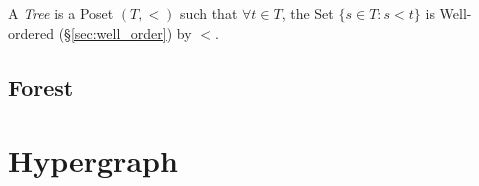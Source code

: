 A \emph{Tree} is a Poset $(T,<)$ such that $\forall t \in T$, the Set
$\{s \in T : s < t \}$ is Well-ordered (\S\ref{sec:well_order}) by
$<$.



\subsection{Forest} \label{sec:forest}



\section{Hypergraph} \label{sec:hypergraph}
